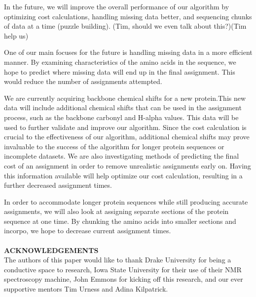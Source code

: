 \documentclass{article}
\begin{document}
In the future, we will improve the overall performance of our algorithm by optimizing cost calculations, handling missing data better, and sequencing chunks of data at a time (puzzle building). (Tim, should we even talk about this?)(Tim help us)

One of our main focuses for the future is handling missing data in a more efficient manner. By examining characteristics of the amino acids in the sequence, we hope to predict where missing data will end up in the final assignment. This would reduce the number of assignments attempted. 

We are currently acquiring backbone chemical shifts for a new protein.This new data will include additional chemical shifts that can be used in the assignment process, such as the backbone carbonyl and H-alpha values. This data will be used to further validate and improve our algorithm. Since the cost calculation is crucial to the effectiveness of our algorithm, additional chemical shifts may prove invaluable to the success of the algorithm for longer protein sequences or incomplete datasets. We are also investigating methods of predicting the final cost of an assignment in order to remove unrealistic assignments early on. Having this information available will help optimize our cost calculation, resulting in a further decreased assignment times. 

In order to accommodate longer protein sequences while still producing accurate assignments, we will also look at assigning separate sections of the protein sequence at one time. By chunking the amino acids into smaller sections and incorpo, we hope to decrease current assignment times. 
\\\\
\textbf{ACKNOWLEDGEMENTS}\\
The authors of this paper would like to thank Drake University for being a conductive space to research, Iowa State University for their use of their NMR spectroscopy machine, John Emmons for kicking off this research, and our ever supportive mentors Tim Urness and Adina Kilpatrick. 

\noindent\textbf {}
\clearpage
\nocite{*}

%

\end{document}

